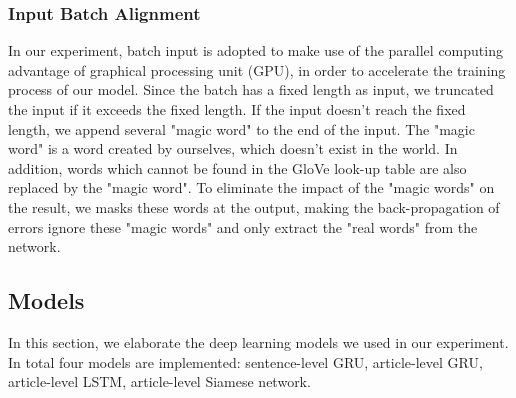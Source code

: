 \documentclass{article} %
\begin{document}
\subsubsection{Input Batch Alignment}
In our experiment, batch input is adopted to make use of the parallel computing advantage of graphical processing unit (GPU), in order to accelerate the training process of our model. 
Since the batch has a fixed length as input, we truncated the input if it exceeds the fixed length. If the input doesn't reach the fixed length, we append several "magic word" to the end of the input. The "magic word" is a word created by ourselves, which doesn't exist in the world.
In addition, words which cannot be found in the GloVe look-up table are also replaced by the "magic word". To eliminate the impact of the "magic words" on the result, we masks these words at the output, making the back-propagation of errors ignore these "magic words" and only extract the "real words" from the network.

\subsection{Models}

In this section, we elaborate the deep learning models we used in our experiment. In total four models are implemented: sentence-level GRU, article-level GRU, article-level LSTM, article-level Siamese network.
\end{document}
